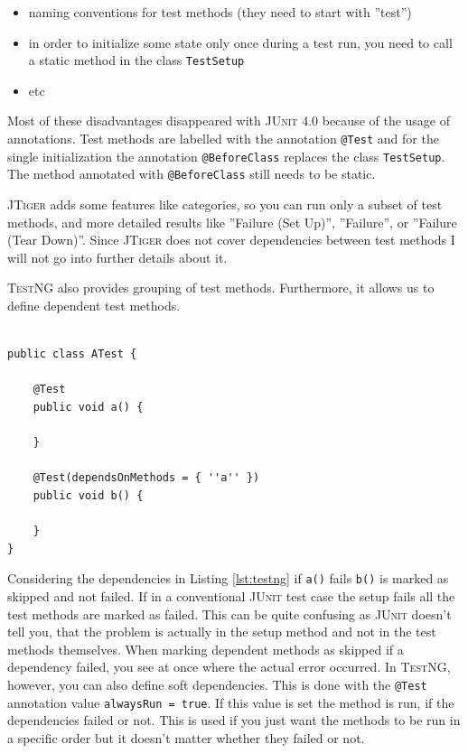 \documentclass[11pt,a4paper,pdftex]{article}
\makeatletter
\newcommand{\JUnit}{\textsc{JUnit}\xspace}
\newcommand{\TestNG}{\textsc{TestNG}\xspace}
\newcommand{\JTiger}{\textsc{JTiger}\xspace}
\newcommand{\ttt}[1]{\texttt{#1}}
\newcommand{\nb}[2]{
    \fbox{\bfseries\sffamily\scriptsize#1: #2}
    }
\newcommand{\todo}[1]{\nb{TODO}{#1}}
\newcommand{\attest}{\ttt{@Test}\xspace}
\makeatother
\begin{document}
\todo{more, better disadvantages}

\begin{itemize}
 \item naming conventions for test methods (they need to start with ''test'')
 \item in order to initialize some state only once during a test run, you need to call a static method in the class \ttt{TestSetup}
 \item etc
\end{itemize}

Most of these disadvantages disappeared with \JUnit 4.0 because of the usage of annotations. Test methods are labelled with the annotation \attest and for the single initialization the annotation \ttt{@BeforeClass} replaces the class \ttt{TestSetup}. The method annotated with \ttt{@BeforeClass} still needs to be static.

\JTiger adds some features like categories, so you can run only a subset of test methods, and more detailed results like ''Failure (Set Up)'', ''Failure'', or ''Failure (Tear Down)''. Since \JTiger does not cover dependencies between test methods I will not go into further details about it.

\TestNG also provides grouping of test methods. Furthermore, it allows us to define dependent test methods.

\begin{lstlisting}[label=lst:testng,caption=Dependent test methods with \TestNG.]

public class ATest {

	@Test
	public void a() {
		
	}
	
	@Test(dependsOnMethods = { ''a'' })
	public void b() {
	
	}
}

\end{lstlisting}

Considering the dependencies in Listing \ref{lst:testng} if \ttt{a()} fails \ttt{b()} is marked as skipped and not failed. If in a conventional \JUnit test case the setup fails all the test methods are marked as failed. This can be quite confusing as \JUnit doesn't tell you, that the problem is actually in the setup method and not in the test methods themselves. When marking dependent methods as skipped if a dependency failed, you see at once where the actual error occurred. In \TestNG, however, you can also define soft dependencies. This is done with the \attest annotation value \ttt{alwaysRun = true}. If this value is set the method is run, if the dependencies failed or not. This is used if you just want the methods to be run in a specific order but it doesn't matter whether they failed or not.
\end{document}
